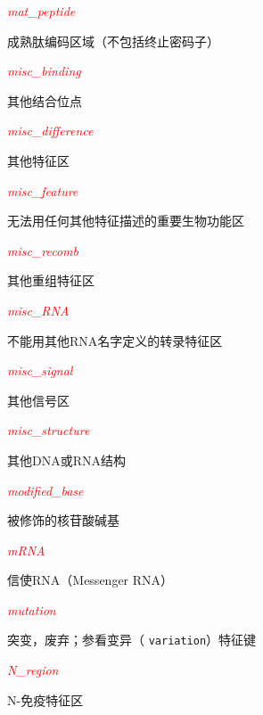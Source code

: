 \textcolor{red}{\textit{mat\_peptide}}
\begin{adjustwidth}{4em}{}
成熟肽编码区域（不包括终止密码子）
\end{adjustwidth}

\textcolor{red}{\textit{misc\_binding}}
\begin{adjustwidth}{4em}{}
其他结合位点
\end{adjustwidth}

\textcolor{red}{\textit{misc\_difference}}
\begin{adjustwidth}{4em}{}
其他特征区
\end{adjustwidth}

\textcolor{red}{\textit{misc\_feature}}
\begin{adjustwidth}{4em}{}
无法用任何其他特征描述的重要生物功能区
\end{adjustwidth}

\textcolor{red}{\textit{misc\_recomb}}
\begin{adjustwidth}{4em}{}
其他重组特征区
\end{adjustwidth}

\textcolor{red}{\textit{misc\_RNA}}
\begin{adjustwidth}{4em}{}
不能用其他RNA名字定义的转录特征区
\end{adjustwidth}

\textcolor{red}{\textit{misc\_signal}}
\begin{adjustwidth}{4em}{}
其他信号区
\end{adjustwidth}

\textcolor{red}{\textit{misc\_structure}}
\begin{adjustwidth}{4em}{}
其他DNA或RNA结构
\end{adjustwidth}

\textcolor{red}{\textit{modified\_base}}
\begin{adjustwidth}{4em}{}
被修饰的核苷酸碱基
\end{adjustwidth}

\textcolor{red}{\textit{mRNA}}
\begin{adjustwidth}{4em}{}
信使RNA（Messenger RNA）
\end{adjustwidth}

\textcolor{red}{\textit{mutation}}
\begin{adjustwidth}{4em}{}
突变，废弃；参看变异（ \verb|variation|）特征键
\end{adjustwidth}

\textcolor{red}{\textit{N\_region}}
\begin{adjustwidth}{4em}{}
N-免疫特征区
\end{adjustwidth}

